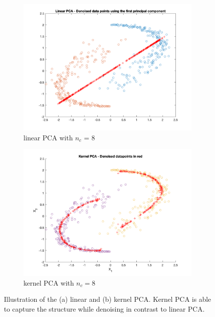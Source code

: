 \documentclass[a4paper, 11pt, one column]{article}
\begin{document}
\begin{figure}[H]
    \centering
    \begin{subfigure}{0.45\linewidth}
            \includegraphics[width=\linewidth]{images/linear_pca_8comps.png}
            \caption{linear PCA with $n_c$ = 8}
        \end{subfigure}\hfil
        \begin{subfigure}{0.45\linewidth}
            \includegraphics[width=\linewidth]{images/kernel_pca_8comps.png}
            \caption{kernel PCA with $n_c = 8$}
        \end{subfigure}\hfil
    \caption{Illustration of the (a) linear and (b) kernel PCA. Kernel PCA is able to capture the structure while denoising in contrast to linear PCA.}
    \label{fig:linearVSkernelPCA}
\end{figure}
\end{document}
